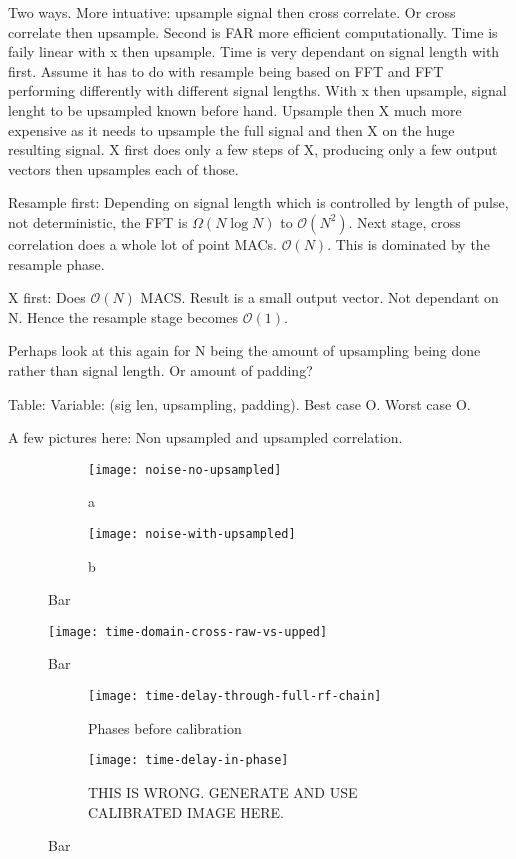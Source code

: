 Two ways. More intuative: upsample signal then cross correlate. 
Or cross correlate then upsample. Second is FAR more efficient computationally. 
Time is faily linear with x then upsample. Time is very dependant on signal length with first. Assume it has to do with resample being based on FFT and FFT performing differently with different signal lengths. With x then upsample, signal lenght to be upsampled known before hand.
Upsample then X much more expensive as it needs to upsample the full signal and then X on the huge resulting signal.
X first does only a few steps of X, producing only a few output vectors then upsamples each of those.

Resample first:
Depending on signal length which is controlled by length of pulse, not deterministic, the FFT is \(\Omega(N\log{N})\) to \(\mathcal{O}(N^2)\). Next stage, cross correlation does a whole lot of point MACs. \(\mathcal{O}(N)\). This is dominated by the resample phase. 

X first: Does \(\mathcal{O}(N)\) MACS. Result is a small output vector. Not dependant on N. Hence the resample stage becomes \(\mathcal{O}(1)\). 

Perhaps look at this again for N being the amount of upsampling being done rather than signal length. Or amount of padding?

Table: Variable: (sig len, upsampling, padding). Best case O. Worst case O. 

A few pictures here:
Non upsampled and upsampled correlation.
\begin{figure}
  \centering
  \begin{subfigure}[b]{0.49\textwidth}
    \centering
    \texttt{[image: noise-no-upsampled]}
    \caption{a}
  \end{subfigure}
  \begin{subfigure}[b]{0.49\textwidth}
    \centering
    \texttt{[image: noise-with-upsampled]}
    \caption{b}
  \end{subfigure}
  \caption{Bar}
\end{figure}

\begin{figure}
  \centering
  \texttt{[image: time-domain-cross-raw-vs-upped]}
  \caption{Bar}
  \label{fig:software-aseaweawea}
\end{figure}

\begin{figure}
  \centering
  \begin{subfigure}[b]{0.49\textwidth}
    \centering
    \texttt{[image: time-delay-through-full-rf-chain]}
    \caption{Phases before calibration}
  \end{subfigure}
  \begin{subfigure}[b]{0.49\textwidth}
    \centering
    \texttt{[image: time-delay-in-phase]}
    \caption{THIS IS WRONG. GENERATE AND USE CALIBRATED IMAGE HERE.}
  \end{subfigure}
  \caption{Bar}
\end{figure}

